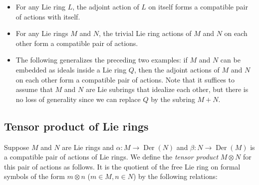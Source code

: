 \documentclass{ucetd}
\begin{document}
\begin{itemize}
\item For any Lie ring $L$, the adjoint action of $L$ on itself forms
  a compatible pair of actions with itself.
\item For any Lie rings $M$ and $N$, the trivial Lie ring actions of
  $M$ and $N$ on each other form a compatible pair of actions.
\item The following generalizes the preceding two examples: if $M$ and
  $N$ can be embedded as ideals inside a Lie ring $Q$, then the
  adjoint actions of $M$ and $N$ on each other form a compatible pair
  of actions. Note that it suffices to assume that $M$ and $N$ are Lie
  subrings that idealize each other, but there is no loss of generality
  since we can replace $Q$ by the subring $M + N$.
\end{itemize}

\subsection{Tensor product of Lie rings}

Suppose $M$ and $N$ are Lie rings and $\alpha:M \to
\operatorname{Der}(N)$ and $\beta:N \to \operatorname{Der}(M)$ is a
compatible pair of actions of Lie rings. We define the {\em tensor
  product} $M \otimes N$ for this pair of actions as follows. It is
the quotient of the free Lie ring on formal symbols of the form $m
\otimes n$ ($m \in M, n \in N$) by the following relations:
\end{document}
